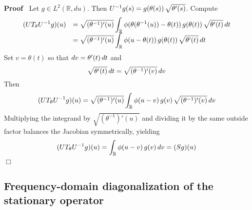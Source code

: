 \documentclass{article}
\newenvironment{proof}{\noindent\textbf{Proof\ }}{\hspace*{\fill}$\Box$\medskip}
{\theorembodyfont{\rmfamily}\newtheorem{example}{Example}}
\begin{document}
\begin{proof}
  Let $g \in L^2 (\mathbb{R}, du)$. Then $U^{- 1} g (s) = g (\theta (s))
  \hspace{0.17em} \sqrt{\theta' (s)}$. Compute
  \begin{equation}
    \text{$\begin{array}{ll}
      (UT_{\theta} U^{- 1} g) (u) & = \sqrt{(\theta^{- 1})' (u)} 
      \int_{\mathbb{R}} \phi (\theta (\theta^{- 1} (u)) - \theta (t)) 
      \hspace{0.17em} g (\theta (t)) \hspace{0.17em} \sqrt{\theta' (t)} 
      \hspace{0.17em} dt\\
      & = \sqrt{(\theta^{- 1})' (u)}  \int_{\mathbb{R}} \phi (u - \theta (t))
      \hspace{0.17em} g (\theta (t)) \hspace{0.17em} \sqrt{\theta' (t)} 
      \hspace{0.17em} dt
    \end{array}$}
  \end{equation}
  Set $v = \theta (t)$ so that $dv = \theta' (t)  \hspace{0.17em} dt$ and
  \begin{equation}
    \sqrt{\theta' (t)}  \hspace{0.17em} dt = \sqrt{(\theta^{- 1})' (v)} 
    \hspace{0.17em} dv
  \end{equation}
  Then
  \begin{equation}
    (UT_{\theta} U^{- 1} g) (u) = \sqrt{(\theta^{- 1})' (u)} 
    \int_{\mathbb{R}} \phi (u - v)  \hspace{0.17em} g (v) \hspace{0.17em}
    \sqrt{(\theta^{- 1})' (v)}  \hspace{0.17em} dv
  \end{equation}
  Multiplying the integrand by $\sqrt{(\theta^{- 1})' (u)}$ and dividing it by
  the same outside factor balances the Jacobian symmetrically, yielding
  \[ (UT_{\theta} U^{- 1} g) (u) = \int_{\mathbb{R}} \phi (u - v) 
     \hspace{0.17em} g (v)  \hspace{0.17em} dv = (Sg) (u) \]
\end{proof}

\subsection{Frequency-domain diagonalization of the stationary operator}
\end{document}
